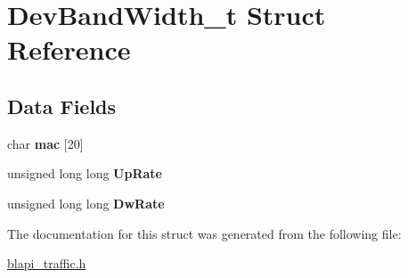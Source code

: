 \hypertarget{structDevBandWidth__t}{}\section{Dev\+Band\+Width\+\_\+t Struct Reference}
\label{structDevBandWidth__t}
\subsection*{Data Fields}
\begin{DoxyCompactItemize}
\item 
\mbox{\label{structDevBandWidth__t_a3221f68eceb7d4d181ccb42d393d14f4}} 
char {\bfseries mac} \mbox{[}20\mbox{]}
\item 
\mbox{\label{structDevBandWidth__t_abb81d022a9eb8b71ca833420cc611d76}} 
unsigned long long {\bfseries Up\+Rate}
\item 
\mbox{\label{structDevBandWidth__t_a86e8e40508c66bee1ba6437fe14e78e0}} 
unsigned long long {\bfseries Dw\+Rate}
\end{DoxyCompactItemize}


The documentation for this struct was generated from the following file\+:\begin{DoxyCompactItemize}
\item 
\hyperlink{blapi__traffic_8h}{blapi\+\_\+traffic.\+h}\end{DoxyCompactItemize}
